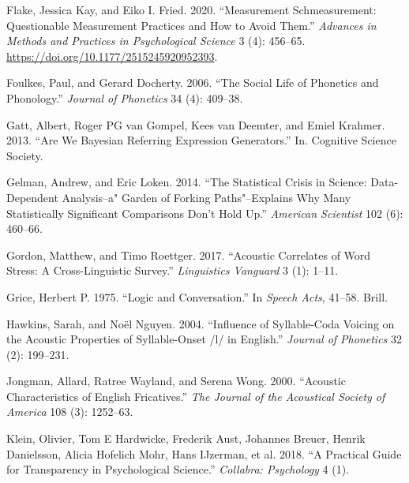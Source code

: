 \documentclass[
  12pt,
]{article}
\newlength{\cslhangindent}
\newenvironment{CSLReferences}[2] %
 {%
  \setlength{\parindent}{0pt}
  \ifodd #1 \everypar{\setlength{\hangindent}{\cslhangindent}}\ignorespaces\fi
  \ifnum #2 > 0
  \setlength{\parskip}{#2\baselineskip}
  \fi
 }%
 {}
\begin{document}
\begin{CSLReferences}{1}{0}
\leavevmode{}%
Flake, Jessica Kay, and Eiko I. Fried. 2020. {``Measurement Schmeasurement: Questionable Measurement Practices and How to Avoid Them.''} \emph{Advances in Methods and Practices in Psychological Science} 3 (4): 456--65. \url{https://doi.org/10.1177/2515245920952393}.

\leavevmode{}%
Foulkes, Paul, and Gerard Docherty. 2006. {``The Social Life of Phonetics and Phonology.''} \emph{Journal of Phonetics} 34 (4): 409--38.

\leavevmode{}%
Gatt, Albert, Roger PG van Gompel, Kees van Deemter, and Emiel Krahmer. 2013. {``Are We Bayesian Referring Expression Generators.''} In. Cognitive Science Society.

\leavevmode{}%
Gelman, Andrew, and Eric Loken. 2014. {``The Statistical Crisis in Science: Data-Dependent Analysis--a" Garden of Forking Paths"--Explains Why Many Statistically Significant Comparisons Don't Hold Up.''} \emph{American Scientist} 102 (6): 460--66.

\leavevmode{}%
Gordon, Matthew, and Timo Roettger. 2017. {``Acoustic Correlates of Word Stress: A Cross-Linguistic Survey.''} \emph{Linguistics Vanguard} 3 (1): 1--11.

\leavevmode{}%
Grice, Herbert P. 1975. {``Logic and Conversation.''} In \emph{Speech Acts}, 41--58. Brill.

\leavevmode{}%
Hawkins, Sarah, and Noël Nguyen. 2004. {``Influence of Syllable-Coda Voicing on the Acoustic Properties of Syllable-Onset /l/ in {E}nglish.''} \emph{Journal of Phonetics} 32 (2): 199--231.

\leavevmode{}%
Jongman, Allard, Ratree Wayland, and Serena Wong. 2000. {``Acoustic Characteristics of English Fricatives.''} \emph{The Journal of the Acoustical Society of America} 108 (3): 1252--63.

\leavevmode{}%
Klein, Olivier, Tom E Hardwicke, Frederik Aust, Johannes Breuer, Henrik Danielsson, Alicia Hofelich Mohr, Hans IJzerman, et al. 2018. {``A Practical Guide for Transparency in Psychological Science.''} \emph{Collabra: Psychology} 4 (1).


\end{CSLReferences}
\end{document}
